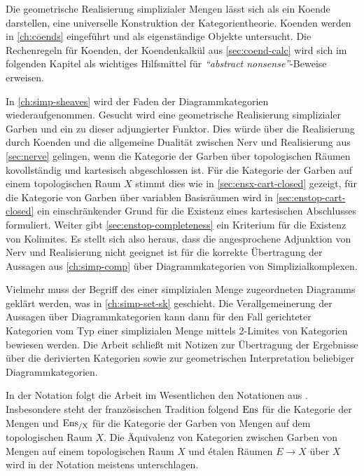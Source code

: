 Die geometrische Realisierung simplizialer Mengen lässt sich als ein
Koende darstellen, eine universelle Konstruktion der
Kategorientheorie. Koenden werden in \autoref{ch:coends} eingeführt
und als eigenständige Objekte untersucht. Die Rechenregeln für
Koenden, der Koendenkalkül aus \autoref{sec:coend-calc} wird sich im
folgenden Kapitel als wichtiges Hilfsmittel für \emph{``abstract
  nonsense''}-Beweise erweisen.

In \autoref{ch:simp-sheaves} wird der Faden der Diagrammkategorien
wiederaufgenommen. Gesucht wird eine geometrische Realisierung
simplizialer Garben und ein zu dieser adjungierter Funktor. Dies würde
über die Realisierung durch Koenden und die allgemeine Dualität
zwischen Nerv und Realisierung aus \autoref{sec:nerve} gelingen, wenn
die Kategorie der Garben über topologischen Räumen kovollständig und
kartesisch abgeschlossen ist. Für die Kategorie der Garben auf einem
topologischen Raum $X$ stimmt dies wie in
\autoref{sec:ensx-cart-closed} gezeigt, für die Kategorie von Garben
über variablen Basisräumen wird in \autoref{sec:enstop-cart-closed}
ein einschränkender Grund für die Existenz eines kartesischen
Abschlusses formuliert. Weiter gibt \autoref{sec:enstop-completeness}
ein Kriterium für die Existenz von Kolimites. Es stellt sich also
heraus, dass die angesprochene Adjunktion von Nerv und Realisierung
nicht geeignet ist für die korrekte Übertragung der Aussagen aus
\autoref{ch:simp-comp} über Diagrammkategorien von
Simplizialkomplexen.

Vielmehr muss der Begriff des einer simplizialen Menge zugeordneten
Diagramms geklärt werden, was in \autoref{ch:simp-set-sk}
geschieht. Die Verallgemeinerung der Aussagen über Diagrammkategorien
kann dann für den Fall gerichteter Kategorien vom Typ einer
simplizialen Menge mittels 2-Limites von Kategorien bewiesen
werden. Die Arbeit schließt mit Notizen zur Übertragung der Ergebnisse
über die derivierten Kategorien sowie zur geometrischen Interpretation
beliebiger Diagrammkategorien.

In der Notation folgt die Arbeit im Wesentlichen den Notationen aus
\cite{TG}. Insbesondere steht der französischen Tradition folgend
$\operatorname{Ens}$ für die Kategorie der Mengen und $\operatorname{Ens_{/X}}$ für die Kategorie der
Garben von Mengen auf dem topologischen Raum $X$. Die Äquivalenz von
Kategorien zwischen Garben von Mengen auf einem topologischen Raum $X$
und étalen Räumen $E \to X$ über $X$ wird in der Notation meistens
unterschlagen.

